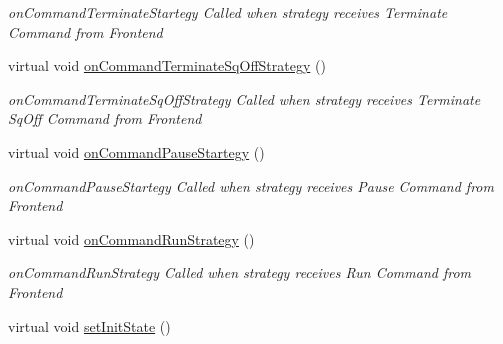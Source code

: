\begin{DoxyCompactItemize}
\begin{DoxyCompactList}\small\item\em on\-Command\-Terminate\-Startegy Called when strategy receives Terminate Command from Frontend \end{DoxyCompactList}\item 
\hypertarget{class_a_p_i2_1_1_s_g_context_a5ec31bc87d26adcc8ad2674de078404d}{virtual void \hyperlink{class_a_p_i2_1_1_s_g_context_a5ec31bc87d26adcc8ad2674de078404d}{on\-Command\-Terminate\-Sq\-Off\-Strategy} ()}\label{class_a_p_i2_1_1_s_g_context_a5ec31bc87d26adcc8ad2674de078404d}

\begin{DoxyCompactList}\small\item\em on\-Command\-Terminate\-Sq\-Off\-Strategy Called when strategy receives Terminate Sq\-Off Command from Frontend \end{DoxyCompactList}\item 
\hypertarget{class_a_p_i2_1_1_s_g_context_a0a5fe07c99f6552a5fca285d5ee4cacd}{virtual void \hyperlink{class_a_p_i2_1_1_s_g_context_a0a5fe07c99f6552a5fca285d5ee4cacd}{on\-Command\-Pause\-Startegy} ()}\label{class_a_p_i2_1_1_s_g_context_a0a5fe07c99f6552a5fca285d5ee4cacd}

\begin{DoxyCompactList}\small\item\em on\-Command\-Pause\-Startegy Called when strategy receives Pause Command from Frontend \end{DoxyCompactList}\item 
\hypertarget{class_a_p_i2_1_1_s_g_context_a401a5daadf6b23661671a36c8de5b7e1}{virtual void \hyperlink{class_a_p_i2_1_1_s_g_context_a401a5daadf6b23661671a36c8de5b7e1}{on\-Command\-Run\-Strategy} ()}\label{class_a_p_i2_1_1_s_g_context_a401a5daadf6b23661671a36c8de5b7e1}

\begin{DoxyCompactList}\small\item\em on\-Command\-Run\-Strategy Called when strategy receives Run Command from Frontend \end{DoxyCompactList}\item 
\hypertarget{class_a_p_i2_1_1_s_g_context_a3702772e298bb872981d4dd982ccb9a1}{virtual void \hyperlink{class_a_p_i2_1_1_s_g_context_a3702772e298bb872981d4dd982ccb9a1}{set\-Init\-State} ()}\label{class_a_p_i2_1_1_s_g_context_a3702772e298bb872981d4dd982ccb9a1}


\end{DoxyCompactItemize}
